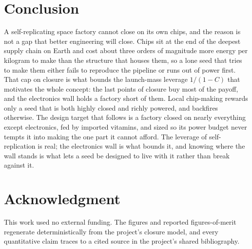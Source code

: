 \section{Conclusion}

A self-replicating space factory cannot close on its own chips, and the reason is not a
gap that better engineering will close. Chips sit at the end of the deepest supply chain on
Earth and cost about three orders of magnitude more energy per kilogram to make than the
structure that houses them, so a lone seed that tries to make them either fails to
reproduce the pipeline or runs out of power first. That cap on closure is what bounds the
launch-mass leverage $1/(1-C)$ that motivates the whole concept: the last points of closure
buy most of the payoff, and the electronics wall holds a factory short of them. Local
chip-making rewards only a seed that is both highly closed and richly powered, and backfires
otherwise. The design target that follows is a factory closed on nearly everything except
electronics, fed by imported vitamins, and sized so its power budget never tempts it into
making the one part it cannot afford. The leverage of self-replication is real; the
electronics wall is what bounds it, and knowing where the wall stands is what lets a seed be
designed to live with it rather than break against it.

\section*{Acknowledgment}
This work used no external funding. The figures and reported figures-of-merit regenerate
deterministically from the project's closure model, and every quantitative claim traces to
a cited source in the project's shared bibliography.
